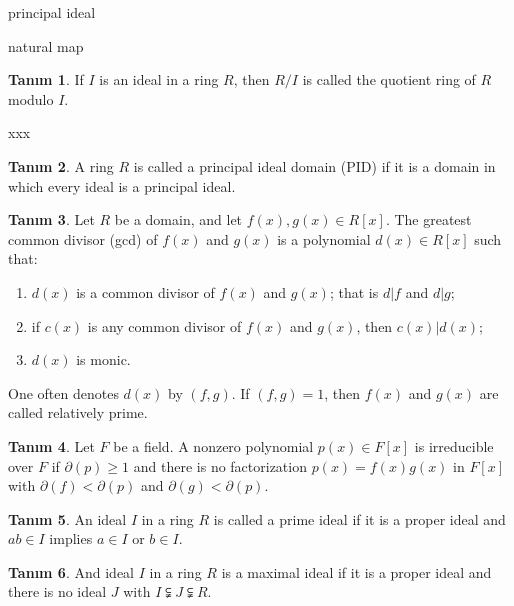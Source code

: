 \documentclass[draft]{article}
\theoremstyle{definition}
\newtheorem{defn}{Tanım}[section]
\theoremstyle{remark}
\begin{document}
    		principal ideal
    		
    		natural map
    		
    		\begin{defn}
    			If $I$ is an ideal in a ring $R$, then $R/I$ is called the quotient ring of $R$ modulo $I$.
    		\end{defn}
    		
    		xxx
    		
    		\begin{defn}
    			A ring $R$ is called a principal ideal domain (PID) if it is a domain in which every ideal is a principal ideal.
    		\end{defn}
    		
    		\begin{defn}
    			Let $R$ be a domain, and let $f(x), g(x) \in R[x]$. The greatest common divisor (gcd) of $f(x)$ and $g(x)$ is a polynomial $d(x) \in R[x]$ such that:
    			\begin{enumerate}
    				\renewcommand{\labelenumi}{(\roman{enumi})}
    				\item $d(x)$ is a common divisor of $f(x)$ and $g(x)$; that is $d | f$ and $d | g$;
    				\item if $c(x)$ is any common divisor of $f(x)$ and $g(x)$, then $c(x) | d(x)$;
    				\item $d(x)$ is monic.
    			\end{enumerate}
    		\end{defn}
    		One often denotes $d(x)$ by $(f, g)$. If $(f, g) = 1$, then $f(x)$ and $g(x)$ are called relatively prime.
    		
    		\begin{defn}
    			Let $F$ be a field. A nonzero polynomial $p(x) \in F[x]$ is irreducible over $F$ if $\partial(p) \geq 1$ and there is no factorization $p(x) = f(x)g(x)$ in $F[x]$ with $\partial(f) < \partial(p)$ and $\partial(g) < \partial(p)$.
    		\end{defn}
    		
    		\begin{defn}
    			An ideal $I$ in a ring $R$ is called a prime ideal if it is a proper ideal and $ab \in I$ implies $a \in I$ or $b \in I$.
    		\end{defn}
    		
    		\begin{defn}
    			And ideal $I$ in a ring $R$ is a maximal ideal if it is a proper ideal and there is no ideal $J$ with $I \subsetneqq J \subsetneqq R$.
    		\end{defn}
    		
\end{document}
